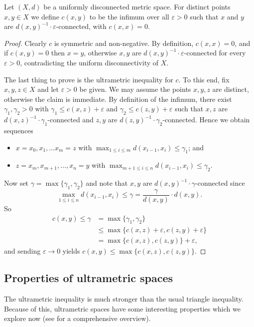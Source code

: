 Let \( (X,d) \) be a uniformly disconnected metric space. For distinct points \( x,y \in X \) we define \( c(x,y) \) to be the infimum over all \( \varepsilon > 0 \) such that \( x \) and \( y \) are \( d(x,y)^{-1} \cdot \varepsilon \)-connected, with \( c(x,x) = 0 \).
\begin{proof}
Clearly \( c \) is symmetric and non-negative. By definition, \( c(x,x) = 0 \), and if \( c(x,y) = 0 \) then \( x = y \), otherwise \( x,y \) are \(d(x,y)^{-1} \cdot \varepsilon \)-connected for every \( \varepsilon > 0 \), contradicting the uniform disconnectivity of \( X \).

The last thing to prove is the ultrametric inequality for \( c \). To this end, fix \( x,y,z \in X \) and let \( \varepsilon > 0 \) be given. We may assume the points \( x,y,z \) are distinct, otherwise the claim is immediate. By definition of the infimum, there exist \( \gamma_1, \gamma_2 > 0 \) with \(\gamma_1 \leq c(x,z) + \varepsilon \) and \(\gamma_2 \leq c(z,y) + \varepsilon \) such that \( x,z \) are \( d(x,z)^{-1} \cdot \gamma_1 \)-connected and \( z,y \) are \(d(z,y)^{-1} \cdot \gamma_2 \)-connected. Hence we obtain sequences
\begin{itemize}[leftmargin=0.8cm]
\item \( x = x_0, x_1, \hdots x_{m} = z \) with \( \max_{1 \leq i \leq m} d(x_{i-1} , x_{i}) \leq \gamma_1 \); and
\item \( z = x_{m} , x_{m+1} , \hdots , x_{n} = y \) with \( \max_{m+1 \leq i \leq n} d(x_{i-1} , x_{i}) \leq \gamma_2 \). 
\end{itemize}
Now set \( \gamma = \max \{ \gamma_1, \gamma_2 \} \) and note that \( x,y \) are \(d(x,y)^{-1}\cdot \gamma \)-connected since \[ \max _{1 \leq i \leq n} d(x_{i-1} , x_{i} ) \leq \gamma = \frac{\gamma}{d(x,y)} \cdot d(x,y). \] 
So
\begin{align*}
c(x,y) \leq \gamma &= \max \{ \gamma_1, \gamma_2 \} \\
&\leq \max \{ c(x,z) + \varepsilon , c(z,y) + \varepsilon \} \\
&= \max \{ c(x,z), c(z,y) \} + \varepsilon,
\end{align*}
and sending \( \varepsilon \to 0 \) yields \( c(x,y) \leq \max \{ c(x,z), c(z,y) \} \).
\end{proof}
\subsection{Properties of ultrametric spaces} The ultrametric inequality is much stronger than the usual triangle inequality. Because of this, ultrametric spaces have some interesting properties which we explore now (see \cite{ultrametric:1985} for a comprehensive overview).

